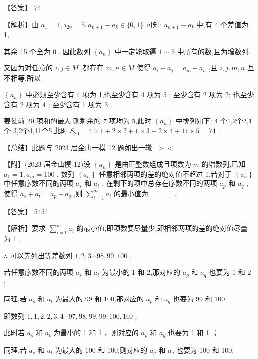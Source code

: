 \documentclass[10pt]{article}
\begin{document}
【答案】 74

【解析】由 \({a}_{1} = 1,{a}_{20} = 5,{a}_{k + 1} - {a}_{k} \in  \{ 0,1\}\) 可知: \({a}_{k + 1} - {a}_{k}\) 中,有 4 个差值为 1,

其余 15 个全为 0 . 因此数列 \(\left\{  {a}_{n}\right\}\) 中一定能取遍 \(1 \sim  5\) 中所有的数,且为增数列.

又因为对任意的 \(i,j \in  M\) ,都存在 \(m,n \in  M\) 使得 \({a}_{i} + {a}_{j} = {a}_{m} + {a}_{n}\) ,且 \(i,j,m,n\) 互不相等,所以

\(\left\{  {a}_{n}\right\}\) 中必须至少含有 4 项为 1,也至少含有 4 项为 5 ; 至少含有 2 项为 2; 也至少含有 2 项为 4 ; 至少含有 1 项为 3 .

要使前 20 项和的最大,则剩余的 7 项均为 5,此时 \(\left\{  {a}_{n}\right\}\) 中排列如下: 4 个1,2个2,1个 3,2个4,11个5,此时 \({S}_{20} = 4 \times  1 + 2 \times  2 + 1 \times  3 + 2 \times  4 + {11} \times  5 = {74}\) .

【总结】此题与 2023 届金山一模 12 题如出一辙. \(>  <\)

【附】(2023 届金山模 12)设 \(\left\{  {a}_{n}\right\}\) 是由正整数组成且项数为 \(m\) 的增数列,已知 \({a}_{1} = 1,{a}_{m} = {100}\) , 数列 \(\left\{  {a}_{n}\right\}\) 任意相邻两项的差的绝对值不超过 1,若对于 \(\left\{  {a}_{n}\right\}\) 中任意序数不同的两项 \({a}_{s}\) 和 \({a}_{t}\) , 在剩下的项中总存在序数不同的两项 \({a}_{p}\) 和 \({a}_{q}\) ,使得 \({a}_{s} + {a}_{t} = {a}_{p} + {a}_{q}\) ,则 \(\mathop{\sum }\limits_{{i = 1}}^{m}{a}_{i}\) 的最小值为\_\_\_\_\_.

【答案】 5454

【解析】要求 \(\mathop{\sum }\limits_{{i = 1}}^{m}{a}_{i}\) 的最小值,即项数要尽量少,即相邻两项的差的绝对值尽量为 1 ,

\(\therefore\) 可以先列出等差数列 \(1,2,3\cdots {98},{99},{100}\) .

若任意序数不同的两项 \({a}_{s}\) 和 \({a}_{t}\) 为最小的 1 和 2,那对应的 \({a}_{p}\) 和 \({a}_{q}\) 也要为 1 和 2 ;

同理,若 \({a}_{s}\) 和 \({a}_{t}\) 为最大的 99 和 100,那对应的 \({a}_{p}\) 和 \({a}_{q}\) 也要为 99 和 100,

即数列 \(1,1,2,2,3,4\cdots {97},{98},{99},{99},{100},{100}\) ;

此时若 \({a}_{s}\) 和 \({a}_{t}\) 为最小的 1 和 1 ，则对应的 \({a}_{p}\) 和 \({a}_{q}\) 也要为 1 和 1 ；

同理,若 \({a}_{s}\) 和 \({a}_{t}\) 为最大的 100 和 100,则对应的 \({a}_{p}\) 和 \({a}_{q}\) 也要为 100 和 100,
\end{document}
